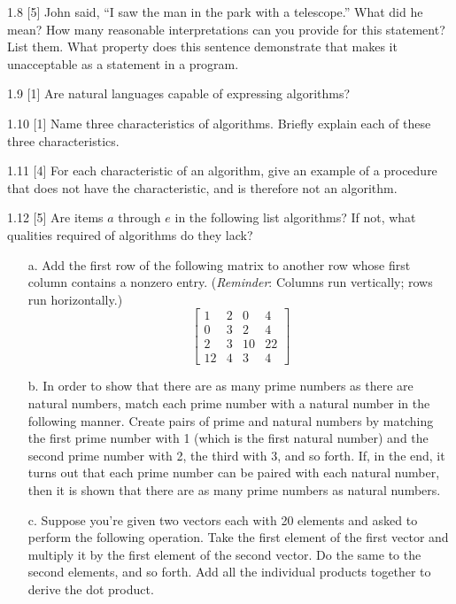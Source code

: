 \documentclass{patt}
\begin{document}
\begin{exercises}
\item[1.8]
[5] John said, ``I saw the man in the park with a telescope.'' What
did he mean? How many reasonable interpretations can you provide
for this statement? List them. What property does this sentence
demonstrate that makes it unacceptable as a statement in a program.

\item[1.9]
[1] Are natural languages capable of expressing algorithms?

\item[1.10]
[1] Name three characteristics of algorithms. Briefly explain each
of these three characteristics.

\item[1.11]
[4] For each characteristic of an algorithm, give an example of a
procedure that does not have the characteristic, and is
therefore not an algorithm.

\item[1.12]
[5] Are items $a$ through $e$ in the following list algorithms? If not, what
qualities required of algorithms do they lack?

\begin{enumerate}[b.]
        \item[a.]
        Add the first row of the following matrix to another
row whose first column contains a nonzero entry. ({\em Reminder}:
Columns run vertically; rows run horizontally.)
$$
        \left[
        \begin{matrix}
        1 & 2 & 0 & 4 \\
        0 & 3 & 2 & 4 \\
        2 & 3 & 10 & 22 \\
        12 & 4 & 3 & 4
        \end{matrix}
        \right]
$$

\item[b.]
In order to show that there are as many prime numbers as there are
natural numbers, match each prime number with a natural number in
the following manner. Create pairs of prime and natural numbers
by matching the first prime number with 1 (which is the first
natural number) and the second prime number with 2, the third
with 3, and so forth. If, in the end, it turns out that each
prime number can be paired with each natural number, then it
is shown that there are as many prime numbers as natural
numbers.

\item[c.]
Suppose you're given two vectors each with 20 elements
and asked to perform the
following operation. Take the first element of the first
vector and multiply it by the first element of the second
vector.  Do the same to the second elements, and so forth.
Add all the individual products together to derive the
dot product.


\end{enumerate}
\end{exercises}
\end{document}
